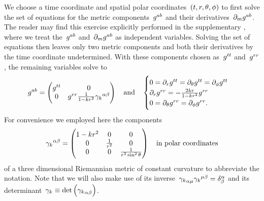 We choose a time coordinate and spatial polar coordinates~$(t,r,\theta,\phi)$ to first solve the set of equations for the metric components~$g^{ab}$ and their derivatives~$\partial_mg^{ab}$. The reader may find this exercise explicitly performed in the supplementary , where we treat the~$g^{ab}$ and~$\partial_mg^{ab}$ as independent variables. Solving the set of equations then leaves only two metric components and both their derivatives by the time coordinate undetermined. With these components chosen as~$g^{tt}$ and~$g^{rr}$, the remaining variables solve to
\begin{align}\label{eq:flrw_met_raw}
	g^{ab}=\begin{pmatrix}
		g^{tt} & 0 \\
		0 & g^{rr}\frac{1}{1-k r{}^2}{\gamma_{k}}^{\alpha\beta}
	\end{pmatrix} \quad \text{and} \quad \begin{cases}
		0=\partial_rg^{tt}=\partial_\theta g^{tt}=\partial_\phi g^{tt}\\
		\partial_rg^{rr}=-\frac{2kr}{1-k r{}^2}g^{rr}\\
		0=\partial_\theta g^{rr}=\partial_\phi g^{rr}
	\mathpunct{.}
	\end{cases}
\end{align}
For convenience we employed here the components
\begin{align}
	{\gamma_{k}}^{\alpha\beta}=\begin{pmatrix}
		1-k r{}^2 & 0 & 0 \\
		0 & \frac{1}{r^2} & 0 \\
		0 & 0 & \frac{1}{r^2\sin^2{\theta}}
	\end{pmatrix} \quad \text{in polar coordinates}
\end{align}
of a three dimensional Riemannian metric of constant curvature to abbreviate the notation. Note that we will also make use of its inverse~${{\gamma_{k}}_{\alpha\mu}{\gamma_{k}}^{\mu\beta}=\delta^\alpha_\beta}$ and its determinant~${{\gamma_{k}}\equiv\det\left({\gamma_{k}}_{\alpha\beta}\right)}$.


